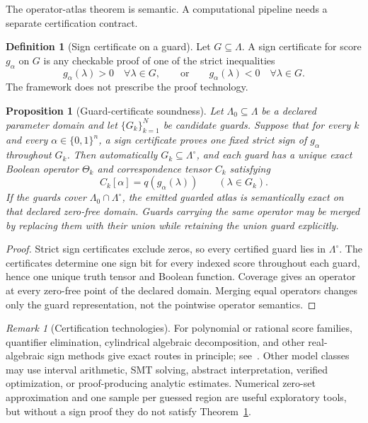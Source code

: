 \documentclass[11pt]{article}
\newtheorem{proposition}[theorem]{Proposition}
\theoremstyle{definition}
\newtheorem{definition}[theorem]{Definition}
\theoremstyle{remark}
\newtheorem{remark}[theorem]{Remark}
\newcommand{\B}{\{0,1\}}
\begin{document}
The operator-atlas theorem is semantic. A computational pipeline needs a separate certification contract.

\begin{definition}[Sign certificate on a guard]
Let $G\subseteq\Lambda$. A sign certificate for score $g_\alpha$ on $G$ is any checkable proof of one of the strict inequalities
\[
 g_\alpha(\lambda)>0\quad\forall\lambda\in G,
 \qquad\text{or}\qquad
 g_\alpha(\lambda)<0\quad\forall\lambda\in G.
\]
The framework does not prescribe the proof technology.
\end{definition}

\begin{proposition}[Guard-certificate soundness]\label{thm:certified}
Let $\Lambda_0\subseteq\Lambda$ be a declared parameter domain and let $\{G_k\}_{k=1}^N$ be candidate guards. Suppose that for every $k$ and every $\alpha\in\B^n$, a sign certificate proves one fixed \emph{strict} sign of $g_\alpha$ throughout $G_k$. Then automatically $G_k\subseteq\Lambda^\circ$, and each guard has a unique exact Boolean operator $\Theta_k$ and correspondence tensor $C_k$ satisfying
\[
 C_k[\alpha]=q(g_\alpha(\lambda))
 \qquad(\lambda\in G_k).
\]
If the guards cover $\Lambda_0\cap\Lambda^\circ$, the emitted guarded atlas is semantically exact on that declared zero-free domain. Guards carrying the same operator may be merged by replacing them with their union while retaining the union guard explicitly.
\end{proposition}

\begin{proof}
Strict sign certificates exclude zeros, so every certified guard lies in $\Lambda^\circ$. The certificates determine one sign bit for every indexed score throughout each guard, hence one unique truth tensor and Boolean function. Coverage gives an operator at every zero-free point of the declared domain. Merging equal operators changes only the guard representation, not the pointwise operator semantics.
\end{proof}

\begin{remark}[Certification technologies]
For polynomial or rational score families, quantifier elimination, cylindrical algebraic decomposition, and other real-algebraic sign methods give exact routes in principle; see~\cite{BasuPollackRoy2006}. Other model classes may use interval arithmetic, SMT solving, abstract interpretation, verified optimization, or proof-producing analytic estimates. Numerical zero-set approximation and one sample per guessed region are useful exploratory tools, but without a sign proof they do not satisfy Theorem~\ref{thm:certified}.
\end{remark}
\end{document}
